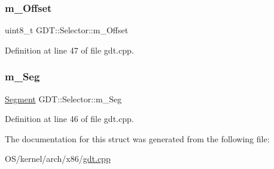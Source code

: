 \subsubsection{\texorpdfstring{m\+\_\+\+Offset}{m\_Offset}}
{\footnotesize\ttfamily uint8\+\_\+t G\+D\+T\+::\+Selector\+::m\+\_\+\+Offset}



Definition at line 47 of file gdt.\+cpp.

\mbox{\label{struct_g_d_t_1_1_selector_a7bff1504d5c83c498334332274bef26d}} 
\subsubsection{\texorpdfstring{m\+\_\+\+Seg}{m\_Seg}}
{\footnotesize\ttfamily \hyperlink{namespace_g_d_t_af2b09941ee46a489ebaccfed5c839154}{Segment} G\+D\+T\+::\+Selector\+::m\+\_\+\+Seg}



Definition at line 46 of file gdt.\+cpp.



The documentation for this struct was generated from the following file\+:\begin{DoxyCompactItemize}
\item 
O\+S/kernel/arch/x86/\hyperlink{gdt_8cpp}{gdt.\+cpp}\end{DoxyCompactItemize}

